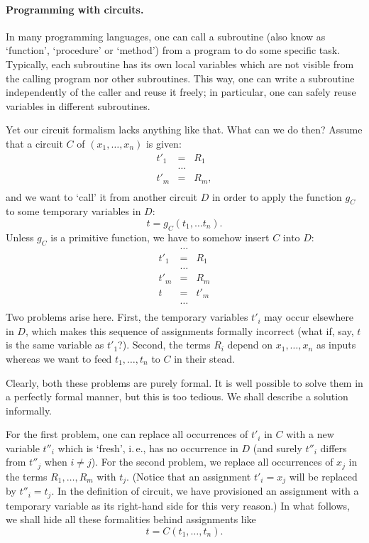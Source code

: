 \documentclass[12pt,notitlepage]{article}
\theoremstyle{plain}
\theoremstyle{definition}
\theoremstyle{plain}
\newcommand{\1}{\mathbf{1}}
\newcommand{\0}{\mathbf{0}}
\begin{document}
\paragraph{Programming with circuits.} In many programming languages, one can call a subroutine (also know as `function', `procedure' or `method') from a program to do some specific task. Typically, each subroutine has its own local variables which are not visible from the calling program nor other subroutines. This way, one can write a subroutine independently of the caller and reuse it freely; in particular, one can safely reuse variables in different subroutines.

Yet our circuit formalism lacks anything like that. What can we do then? Assume that a circuit $C$ of $(x_1, \ldots, x_n)$ is given:
$$
\begin{array}{rcl}
t'_1 &=& R_1\\
&\ldots&\\
t'_m &=& R_m,\\
\end{array}
$$
and we want to `call' it from another circuit $D$ in order to apply the function $g_C$ to some temporary variables in $D$:
$$t = g_C(t_1, \ldots t_n).$$
Unless $g_C$ is a primitive function, we have to somehow insert $C$ into $D$:
$$
\begin{array}{rcl}
&\ldots&\\
t'_1 &=& R_1\\
&\ldots&\\
t'_m &=& R_m\\
t &=& t'_m\\
&\ldots&\\
\end{array}
$$
Two problems arise here. First, the temporary variables $t'_i$ may occur elsewhere in $D$, which makes this sequence of assignments formally incorrect (what if, say, $t$ is the same variable as $t'_1$?). Second, the terms $R_i$ depend on $x_1, \ldots, x_n$ as inputs whereas we want to feed $t_1, \ldots, t_n$ to $C$ in their stead.

Clearly, both these problems are purely formal. It is well possible to solve them in a perfectly formal manner, but this is too tedious. We shall describe a solution informally.

For the first problem, one can replace all occurrences of $t'_i$ in $C$ with a new variable $t''_i$ which is `fresh', i.\,e., has no occurrence in $D$ (and surely $t''_i$ differs from $t''_j$ when $i \neq j$). For the second problem, we replace all occurrences of $x_j$ in the terms $R_1, \ldots, R_m$ with $t_j$. (Notice that an assignment $t'_i = x_j$ will be replaced by $t''_i = t_j$. In the definition of circuit, we have provisioned an assignment with a temporary variable as its right-hand side for this very reason.) In what follows, we shall hide all these formalities behind assignments like
$$t = C(t_1, \ldots, t_n).$$
\end{document}
